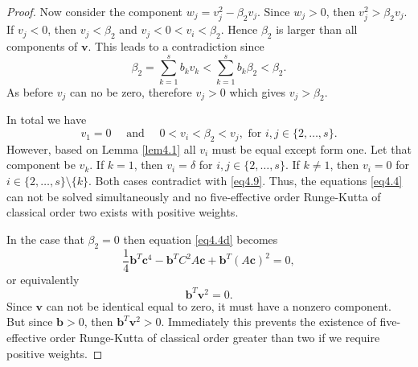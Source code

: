 \begin{proof}
    Now consider the component \( w_{j} = v_{j}^{2} - \beta_{2}v_{j} \). Since \( w_{j} > 0 \), then \( v_{j}^{2} > \beta_{2}v_{j} \). If \( v_{j} < 0 \), then \( v_{j} < \beta_{2} \) and \( v_{j} < 0 < v_{i} < \beta_{2} \). Hence \( \beta_{2} \) is larger than all components of \( \bm{v} \). This leads to a contradiction since
    \begin{equation*}
            \beta_{2} = \sum_{k=1}^{s}b_{k}v_{k} < \sum_{k=1}^{s}b_{k}\beta_{2} < \beta_{2}.
    \end{equation*}
    As before \( v_{j} \) can no be zero, therefore \( v_{j} > 0 \) which gives \( v_{j} > \beta_{2} \).

    In total we have
    \begin{equation}\label{eq4.9}
        v_{1} = 0 \quad \text{ and } \quad 0 < v_{i} < \beta_{2} < v_{j}, \text{ for } i,j \in \{2,\dots,s\}.
    \end{equation}
    However, based on Lemma \ref{lem4.1} all \( v_{i} \) must be equal except form one. Let that component be \( v_{k} \). If \( k = 1 \), then \( v_{i} = \delta \) for \( i,j \in \{2,\dots,s\} \). If \( k \neq 1 \), then \( v_{i} = 0 \) for \( i \in \{2,\dots,s\}\setminus\{k\} \). Both cases contradict with \eqref{eq4.9}. Thus, the equations \eqref{eq4.4} can not be solved simultaneously and no five-effective order Runge-Kutta of classical order two exists with positive weights.
    \newline

    In the case that \( \beta_{2} = 0 \) then equation \eqref{eq4.4d} becomes
    \begin{equation*}
        \frac{1}{4}\bm{b}^{T}\bm{c}^{4} - \bm{b}^{T}C^{2}A\bm{c} + \bm{b}^{T}(A\bm{c})^{2} = 0,
    \end{equation*}
    or equivalently
    \begin{equation*}
        \bm{b}^{T}\bm{v}^{2} = 0.
    \end{equation*}
    Since \( \bm{v} \) can not be identical equal to zero, it must have a nonzero component. But since \( \bm{b} > 0 \), then \( \bm{b}^{T}\bm{v}^{2} > 0 \). Immediately this prevents the existence of five-effective order Runge-Kutta of classical order greater than two if we require positive weights.
\end{proof}